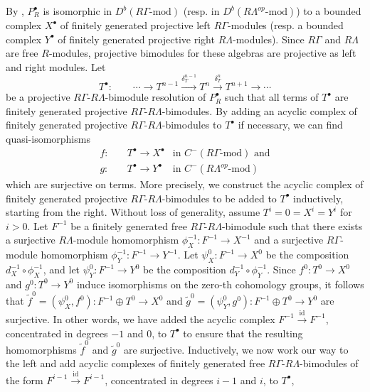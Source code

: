 \documentclass{amsart}
\theoremstyle{plain}
\theoremstyle{definition}
\theoremstyle{remark}
\begin{document}
By \cite[Prop. 3.1]{rickard1}, $P_R^\bullet$ is isomorphic in $D^b(R\Gamma\mbox{-mod})$ 
(resp. in $D^b(R\Lambda^{op}\mbox{-mod})$) to a bounded complex $X^\bullet$ of finitely generated
projective left $R\Gamma$-modules (resp. a bounded complex $Y^\bullet$ of
finitely generated projective right $R\Lambda$-modules). 
Since $R\Gamma$ and $R\Lambda$ are free $R$-modules,
projective bimodules for these algebras 
are projective as left and right modules. Let 
$$T^\bullet: \qquad \cdots \to T^{n-1}\xrightarrow{\delta^{n-1}_T} T^{n}\xrightarrow{\delta^{n}_T}
T^{n+1}\to \cdots$$
be a projective
$R\Gamma$-$R\Lambda$-bimodule resolution of $P_R^\bullet$ such that all terms of $T^\bullet$
are finitely generated projective $R\Gamma$-$R\Lambda$-bimodules. By adding an acyclic complex
of finitely generated projective $R\Gamma$-$R\Lambda$-bimodules to $T^\bullet$ if necessary,
we can find quasi-isomorphisms
\begin{eqnarray}
\label{eq:qissurjective}
f:\quad &T^\bullet \to X^\bullet&\mbox{in $C^-(R\Gamma\mbox{-mod})$ and}\\
g:\quad &T^\bullet \to Y^\bullet&\mbox{in }C^-(R\Lambda^{op}\mbox{-mod})
\nonumber
\end{eqnarray}
which are surjective on terms.
More precisely, we construct the acyclic complex of finitely generated projective $R\Gamma$-$R\Lambda$-bimodules 
to be added to $T^\bullet$ inductively, starting from the right. Without loss of generality, assume $T^i=0=X^i=Y^i$ for $i>0$. 
Let $F^{-1}$ be a finitely generated free $R\Gamma$-$R\Lambda$-bimodule such that there exists a surjective $R\Lambda$-module homomorphism
$\phi_X^{-1}:F^{-1}\to X^{-1}$ and a surjective $R\Gamma$-module homomorphism $\phi_Y^{-1}:F^{-1}\to Y^{-1}$. 
Let $\psi_X^0:F^{-1}\to X^0$ be the composition $d_X^{-1}\circ\phi_X^{-1}$, and let 
$\psi_Y^0:F^{-1}\to Y^0$ be the composition $d_Y^{-1}\circ\phi_Y^{-1}$. Since $f^0:T^0\to X^0$ and $g^0:T^0\to Y^0$ induce
isomorphisms on the zero-th cohomology groups, it follows that $\tilde{f}^0=(\psi_X^0,f^0):F^{-1}\oplus T^0 \to X^0$ and $\tilde{g}^0=(\psi_Y^0,g^0): F^{-1}\oplus T^0\to Y^0$
are surjective. In other words, we have added the acyclic complex $F^{-1}\xrightarrow{\mathrm{id}}F^{-1}$, concentrated in degrees $-1$ and $0$, to $T^\bullet$
to ensure that the resulting homomorphisms $\tilde{f}^0$ and $\tilde{g}^0$ are surjective. Inductively, we now work our way to the left and add acyclic complexes of
finitely generated free $R\Gamma$-$R\Lambda$-bimodules of the form $F^{i-1}\xrightarrow{\mathrm{id}}F^{i-1}$, concentrated in degrees $i-1$ and $i$, to $T^\bullet$,
\end{document}
